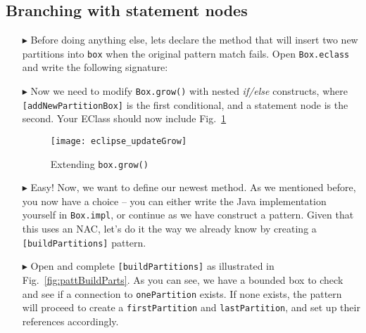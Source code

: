 \newpage
\hypertarget{conBran tex}{}
\subsection{Branching with statement nodes}
\texHeader

\begin{itemize}

\item[$\blacktriangleright$] Before doing anything else, lets declare the method that will insert two new partitions into \texttt{box} when the original pattern
match fails. Open \texttt{Box.eclass} and write the following signature: 

\vspace{0.5cm}

\item[$\blacktriangleright$] Now we need to modify \texttt{Box.grow()} with nested \emph{if/else} constructs, where \texttt{[addNewPartitionBox]} is the first
conditional, and a statement node is the second. Your EClass should now include Fig.~\ref{fig:updateGrow}

\vspace{0.5cm}

\begin{figure}[htp]
\begin{center}
  \texttt{[image: eclipse\_updateGrow]}
  \caption{Extending \texttt{box.grow()}}
  \label{fig:updateGrow}
\end{center}
\end{figure}

\vspace{0.5cm}

\item[$\blacktriangleright$] Easy! Now, we want to define our newest method. As we mentioned before, you now have a choice -- you can either write the Java
implementation yourself in \texttt{Box.impl}, or continue as we have construct a pattern. Given that this uses an NAC, let's do it the way we already know by
creating a \texttt{[buildPartitions]} pattern.

\vspace{0.5cm}

\item[$\blacktriangleright$] Open and complete \texttt{[buildPartitions]} as illustrated in Fig.~\ref{fig:pattBuildParts}. As you can see, we have a bounded
box to check and see if a connection to \texttt{onePartition} exists. If none exists, the pattern will proceed to create a \texttt{firstPartition} and
\texttt{lastPartition}, and set up their references accordingly.


\end{itemize}
